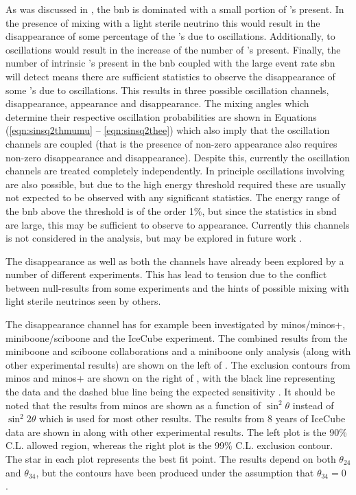As was discussed in , the \gls{bnb} is \numu dominated with a small portion of \nue's present. In the presence of mixing with a light sterile neutrino 
this would result in the disappearance of some percentage of the \numu's due to oscillations. Additionally, \numu to \nue oscillations would result in the increase of the number of \nue's present. Finally, the number of intrinsic \nue's present in the \gls{bnb} coupled with the large event rate \gls{sbn} will detect means there are sufficient statistics to observe the disappearance of some \nue's due to oscillations. This results in three possible oscillation channels, \numu disappearance, \nue appearance and \nue disappearance. The mixing angles which determine their respective oscillation probabilities are shown in Equations (\ref{eqn:sinsq2thmumu} -- \ref{eqn:sinsq2thee}) which also imply that the oscillation channels are coupled (that is the presence of non-zero \nue appearance also requires non-zero \numu disappearance and \nue disappearance). Despite this, currently the oscillation channels are treated completely independently. In principle oscillations involving \nutau are also possible, but due to the high energy threshold required these are usually not expected to be observed with any significant statistics. The energy range of the \gls{bnb} above the \nutau threshold is of the order 1\%, but since the statistics in \gls{sbnd} are large, this may be sufficient to observe \numu to \nutau appearance. Currently this channels is not considered in the analysis, but may be explored in future work \cite{tau_oscillations}.

The \numu disappearance as well as both the \nue channels have already been explored by a number of different experiments. This has lead to tension due to the conflict between null-results from some experiments and the hints of possible mixing with light sterile neutrinos seen by others. 

The \numu disappearance channel has for example been investigated by \gls{minos}/\gls{minos}+, \gls{miniboone}/\gls{sciboone} and the IceCube experiment. The combined results from the \gls{miniboone} and \gls{sciboone} collaborations and a \gls{miniboone} only analysis (along with other experimental results) are shown on the left of . The exclusion contours from \gls{minos} and \gls{minos}+ are shown on the right of , with the black line representing the data and the dashed blue line being the expected sensitivity \cite{MiniBooNE/SciBooNE_numu_disapp_contour} \cite{MINOS_numu_disapp_contour}. It should be noted that the results from \gls{minos} are shown as a function of $\sin^2{\theta}$ instead of $\sin^2{2\theta}$ which is used for most other results. The results from 8 years of IceCube data are shown in  along with other experimental results. The left plot is the 90\% C.L. allowed region, whereas the right plot is the 99\% C.L. exclusion contour. The star in each plot represents the best fit point. The results depend on both $\theta_{24}$ and $\theta_{34}$, but the contours have been produced under the assumption that $\theta_{34} = 0$ \cite{IceCube_numu_disapp_contour}.

